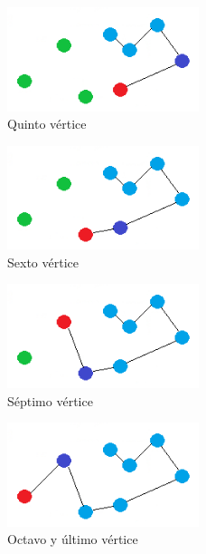 \vspace{0.5cm}
\begin{figure}[htbH] 
	\centering
	\includegraphics[width=0.5\textwidth]{./Imagenes/vecino4.png}
	\caption{Quinto vértice} 
\end{figure}

\vspace{0.5cm}
\begin{figure}[htbH] 
	\centering
	\includegraphics[width=0.5\textwidth]{./Imagenes/vecino5.png}
	\caption{Sexto vértice} 
\end{figure}

\vspace{0.5cm}
\begin{figure}[htbH] 
	\centering
	\includegraphics[width=0.5\textwidth]{./Imagenes/vecino6.png}
	\caption{Séptimo vértice} 
\end{figure}

\vspace{0.5cm}
\begin{figure}[htbH] 
	\centering
	\includegraphics[width=0.5\textwidth]{./Imagenes/vecino7.png}
	\caption{Octavo y último vértice} 
\end{figure}

